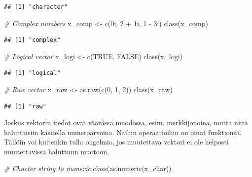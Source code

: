 \documentclass[
]{book}
\newenvironment{Shaded}{\begin{snugshade}}{\end{snugshade}}
\newcommand{\CommentTok}[1]{\textcolor[rgb]{0.56,0.35,0.01}{\textit{#1}}}
\newcommand{\ConstantTok}[1]{\textcolor[rgb]{0.00,0.00,0.00}{#1}}
\newcommand{\DecValTok}[1]{\textcolor[rgb]{0.00,0.00,0.81}{#1}}
\newcommand{\FunctionTok}[1]{\textcolor[rgb]{0.00,0.00,0.00}{#1}}
\newcommand{\NormalTok}[1]{#1}
\newcommand{\OtherTok}[1]{\textcolor[rgb]{0.56,0.35,0.01}{#1}}
\newcommand{\SpecialCharTok}[1]{\textcolor[rgb]{0.00,0.00,0.00}{#1}}
\begin{document}
\begin{verbatim}
## [1] "character"
\end{verbatim}

\begin{Shaded}
\begin{Highlighting}[]
\CommentTok{\# Complex numbers}
\NormalTok{x\_comp }\OtherTok{\textless{}{-}} \FunctionTok{c}\NormalTok{(0i, }\DecValTok{2} \SpecialCharTok{+}\NormalTok{ 1i, }\DecValTok{1} \SpecialCharTok{{-}}\NormalTok{ 3i)}
\FunctionTok{class}\NormalTok{(x\_comp)}
\end{Highlighting}
\end{Shaded}

\begin{verbatim}
## [1] "complex"
\end{verbatim}

\begin{Shaded}
\begin{Highlighting}[]
\CommentTok{\# Logical vector}
\NormalTok{x\_logi }\OtherTok{\textless{}{-}} \FunctionTok{c}\NormalTok{(}\ConstantTok{TRUE}\NormalTok{, }\ConstantTok{FALSE}\NormalTok{)}
\FunctionTok{class}\NormalTok{(x\_logi)}
\end{Highlighting}
\end{Shaded}

\begin{verbatim}
## [1] "logical"
\end{verbatim}

\begin{Shaded}
\begin{Highlighting}[]
\CommentTok{\# Raw vector}
\NormalTok{x\_raw }\OtherTok{\textless{}{-}} \FunctionTok{as.raw}\NormalTok{(}\FunctionTok{c}\NormalTok{(}\DecValTok{0}\NormalTok{, }\DecValTok{1}\NormalTok{, }\DecValTok{2}\NormalTok{))}
\FunctionTok{class}\NormalTok{(x\_raw)}
\end{Highlighting}
\end{Shaded}

\begin{verbatim}
## [1] "raw"
\end{verbatim}

Joskus vektorin tiedot ovat väärässä muodossa, esim. merkkijonoina, mutta niitä haluttaisiin käsitellä numeroarvoina. Näihin operaatioihin on omat funktionsa. Tällöin voi kuitenkin tulla ongelmia, jos muutettava vektori ei ole helposti muutettavissa haluttuun muotoon.

\begin{Shaded}
\begin{Highlighting}[]
\CommentTok{\# Chacter string to numeric}
\FunctionTok{class}\NormalTok{(}\FunctionTok{as.numeric}\NormalTok{(x\_char))}
\end{Highlighting}
\end{Shaded}
\end{document}
